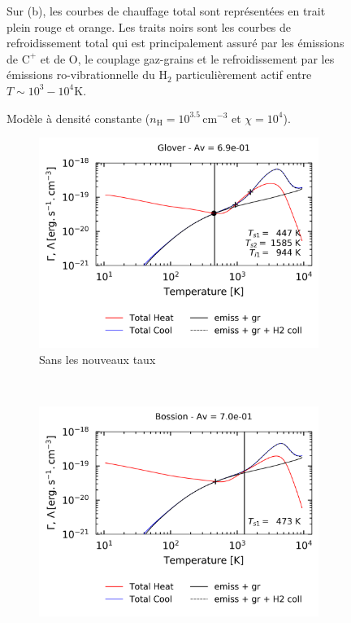 \begin{figure}[!h]
\begin{subfigure}[t]{0.49\textwidth}
    \end{subfigure}
    \caption{Modèle à densité constante ($n_\mathrm{H} = 10^{3.5}\,\mathrm{cm}^{-3}$ et $\chi = 10^4$).}
    \begin{minipage}{\textwidth}
    Sur (b), les courbes de chauffage total sont représentées en trait plein rouge et orange. Les traits noirs sont les courbes de refroidissement total qui est principalement assuré par les émissions de $\mathrm{C}^+$ et de $\mathrm{O}$, le couplage gaz-grains et le refroidissement par les émissions ro-vibrationnelle du $\mathrm{H}_2$ particulièrement actif entre $T\sim10^3-10^4$K.
    \end{minipage}
\end{figure}

\begin{figure}[!h]
    \centering
    \begin{subfigure}[t]{0.49\textwidth} %
        \centering \includegraphics[trim = {0 0 0 1cm },clip,width=1\textwidth]{figure/H2/pic/glover_cooling.png}
        \caption{Sans les nouveaux taux}
        \label{fig:H2:Glover:cooling}
    \end{subfigure}
    ~ 
    \begin{subfigure}[t]{0.49\textwidth}
        \centering \includegraphics[trim = {0 0 0 1cm },clip,width=1\textwidth]{figure/H2/pic/bossion_cooling.png}

\end{subfigure}
\end{figure}
